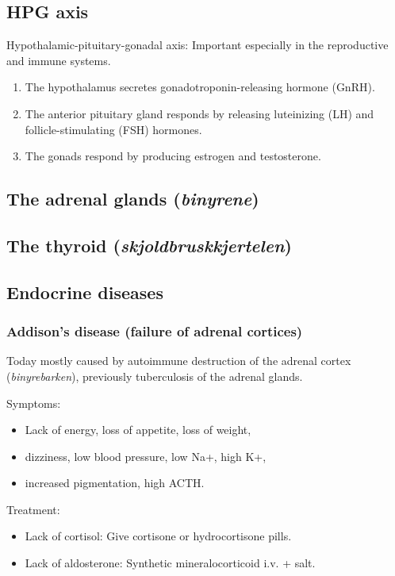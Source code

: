 \subsection{HPG axis}
Hypothalamic-pituitary-gonadal axis: Important especially in the reproductive and immune systems.
\begin{enumerate}
  \item The hypothalamus secretes gonadotroponin-releasing hormone (GnRH).
  \item The anterior pituitary gland responds by releasing luteinizing (LH) and follicle-stimulating (FSH) hormones.
  \item The gonads respond by producing estrogen and testosterone.
\end{enumerate}

\subsection{The adrenal glands (\emph{binyrene})}

\subsection{The thyroid (\emph{skjoldbruskkjertelen})}

\subsection{Endocrine diseases}
\subsubsection{Addison's disease (failure of adrenal cortices)}
Today mostly caused by autoimmune destruction of the adrenal cortex (\emph{binyrebarken}), previously tuberculosis of the adrenal glands.

Symptoms:
\begin{itemize}
  \item Lack of energy, loss of appetite, loss of weight,
  \item dizziness, low blood pressure, low Na+, high K+,
  \item increased pigmentation, high ACTH.
\end{itemize}

Treatment:
\begin{itemize}
  \item Lack of cortisol: Give cortisone or hydrocortisone pills.
  \item Lack of aldosterone: Synthetic mineralocorticoid i.v. + salt.
\end{itemize}

